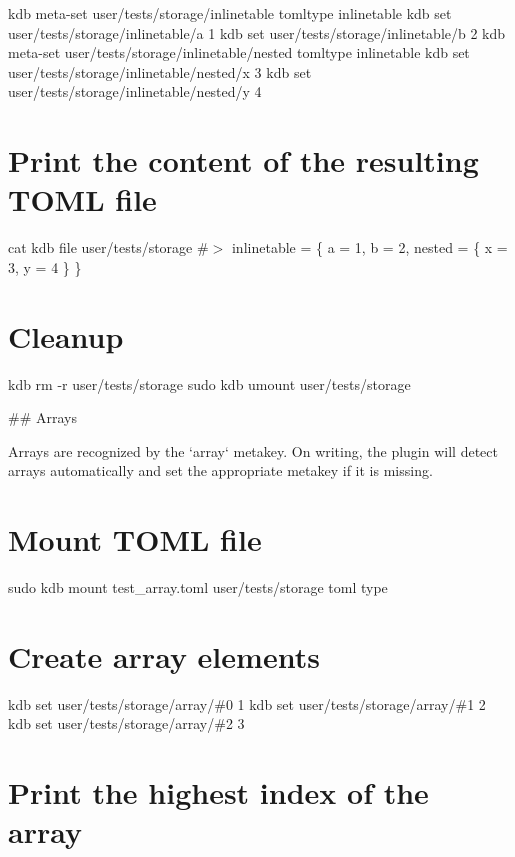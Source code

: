 kdb meta-\/set \textquotesingle{}user/tests/storage/inlinetable\textquotesingle{} \textquotesingle{}tomltype\textquotesingle{} \textquotesingle{}inlinetable\textquotesingle{} kdb set \textquotesingle{}user/tests/storage/inlinetable/a\textquotesingle{} \textquotesingle{}1\textquotesingle{} kdb set \textquotesingle{}user/tests/storage/inlinetable/b\textquotesingle{} \textquotesingle{}2\textquotesingle{} kdb meta-\/set \textquotesingle{}user/tests/storage/inlinetable/nested\textquotesingle{} \textquotesingle{}tomltype\textquotesingle{} \textquotesingle{}inlinetable\textquotesingle{} kdb set \textquotesingle{}user/tests/storage/inlinetable/nested/x\textquotesingle{} \textquotesingle{}3\textquotesingle{} kdb set \textquotesingle{}user/tests/storage/inlinetable/nested/y\textquotesingle{} \textquotesingle{}4\textquotesingle{}\hypertarget{autotoc_md693_autotoc_md771}{}\section{Print the content of the resulting T\+O\+M\+L file}\label{autotoc_md693_autotoc_md771}
cat {\ttfamily kdb file user/tests/storage} \#$>$ inlinetable = \{ a = 1, b = 2, nested = \{ x = 3, y = 4 \} \}\hypertarget{autotoc_md693_autotoc_md772}{}\section{Cleanup}\label{autotoc_md693_autotoc_md772}
kdb rm -\/r user/tests/storage sudo kdb umount user/tests/storage 
\begin{DoxyCode}
## Arrays

Arrays are recognized by the `array` metakey. On writing, the plugin will detect arrays automatically and
       set the appropriate metakey if it is missing.
\end{DoxyCode}
 \hypertarget{autotoc_md693_autotoc_md773}{}\section{Mount T\+O\+M\+L file}\label{autotoc_md693_autotoc_md773}
sudo kdb mount test\+\_\+array.\+toml user/tests/storage toml type\hypertarget{autotoc_md693_autotoc_md774}{}\section{Create array elements}\label{autotoc_md693_autotoc_md774}
kdb set \textquotesingle{}user/tests/storage/array/\#0\textquotesingle{} \textquotesingle{}1\textquotesingle{} kdb set \textquotesingle{}user/tests/storage/array/\#1\textquotesingle{} \textquotesingle{}2\textquotesingle{} kdb set \textquotesingle{}user/tests/storage/array/\#2\textquotesingle{} \textquotesingle{}3\textquotesingle{}\hypertarget{autotoc_md693_autotoc_md775}{}\section{Print the highest index of the array}\label{autotoc_md693_autotoc_md775}
